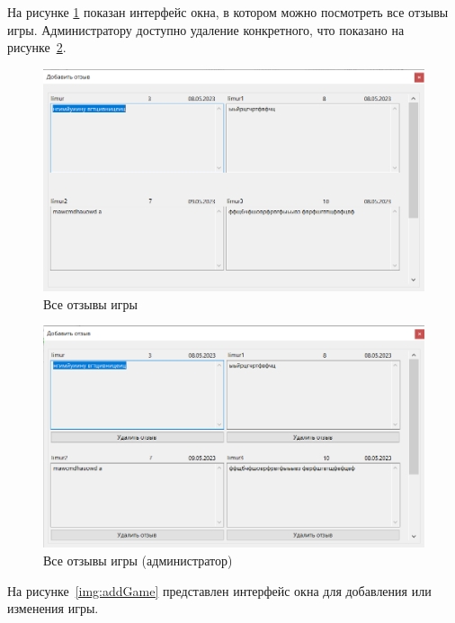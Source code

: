 На рисунке \ref{img:allReviewsU} показан интерфейс окна, в котором можно посмотреть все отзывы игры. Администратору доступно удаление конкретного, что показано на рисунке~\ref{img:allReviewsA}.

\begin{figure}[H]
	\begin{center}
		\includegraphics[scale=0.7]{../imgs/interface/AllReviewsU.png}
	\end{center}
	\captionsetup{justification=centering}
	\caption{Все отзывы игры}
	\label{img:allReviewsU}
\end{figure}

\begin{figure}[H]
	\begin{center}
		\includegraphics[scale=0.7]{../imgs/interface/AllReviewsA.png}
	\end{center}
	\captionsetup{justification=centering}
	\caption{Все отзывы игры (администратор)}
	\label{img:allReviewsA}
\end{figure}

На рисунке~\ref{img:addGame} представлен интерфейс окна для добавления или изменения игры.

